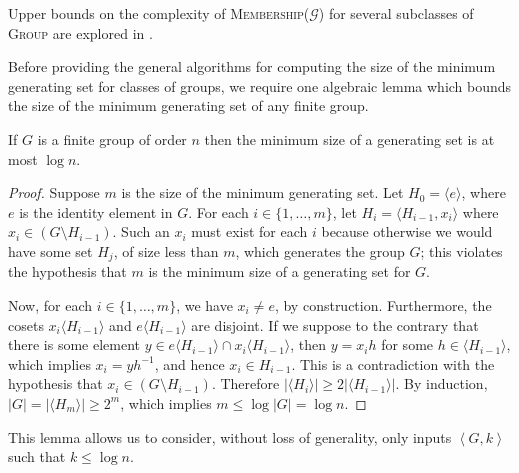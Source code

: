 \documentclass{article}
\newcommand{\gen}[1]{{\langle #1 \rangle}}
\newcommand{\pair}[2]{\left\langle #1, #2 \right\rangle}
\begin{document}
Upper bounds on the complexity of \textsc{Membership($\mathcal{G}$)} for several subclasses of \textsc{Group} are explored in \cite{bklm01}.

Before providing the general algorithms for computing the size of the minimum generating set for classes of groups, we require one algebraic lemma which bounds the size of the minimum generating set of any finite group.

\begin{lemma}\label{lem:log}
  If $G$ is a finite group of order $n$ then the minimum size of a generating set is at most $\log n$.
\end{lemma}
\begin{proof}
  Suppose $m$ is the size of the minimum generating set.
  Let $H_0 = \gen{e}$, where $e$ is the identity element in $G$.
  For each $i \in \{1, \dotsc, m\}$, let $H_i = \gen{H_{i - 1}, x_i}$ where $x_i \in (G \setminus H_{i - 1})$.
  Such an $x_i$ must exist for each $i$ because otherwise we would have some set $H_j$, of size less than $m$, which generates the group $G$; this violates the hypothesis that $m$ is the minimum size of a generating set for $G$.

  Now, for each $i \in \{1, \dotsc, m\}$, we have $x_i \neq e$, by construction.
  Furthermore, the cosets $x_i \gen{H_{i - 1}}$ and $e \gen{H_{i - 1}}$ are disjoint.
  If we suppose to the contrary that there is some element $y \in e \gen{H_{i - 1}} \cap x_i \gen{H_{i - 1}}$, then $y = x_i h$ for some $h \in \gen{H_{i - 1}}$, which implies $x_i = yh^{-1}$, and hence $x_i \in H_{i - 1}$.
  This is a contradiction with the hypothesis that $x_i \in (G \setminus H_{i - 1})$.
  Therefore $|\gen{H_i}| \geq 2 |\gen{H_{i - 1}}|$.
  By induction, $|G| = |\gen{H_m}| \geq 2^m$, which implies $m \leq \log |G| = \log n$.
\end{proof}

This lemma allows us to consider, without loss of generality, only inputs $\pair{G}{k}$ such that $k \leq \log n$.
\end{document}
